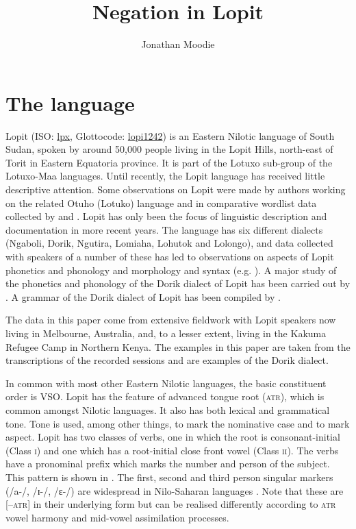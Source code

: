 \documentclass[output=paper,colorlinks,citecolor=brown,draftmode]{langscibook}
\author{Jonathan Moodie\affiliation{University of Melbourne}}
\title{Negation in Lopit}
\begin{document}
\maketitle 
\examplesitalics
\section{The language}

Lopit (ISO: \href{https://iso639-3.sil.org/code/lpx}{lpx}, Glottocode: \href{https://glottolog.org/resource/languoid/id/lopi1242}{lopi1242}) is an Eastern Nilotic language of South Sudan, spoken by around 50,000 people living in the Lopit Hills, north-east of Torit in Eastern Equatoria province. It is part of the Lotuxo sub-group of the Lotuxo-Maa languages. Until recently, the Lopit language has received little descriptive attention. Some observations on Lopit were made by authors working on the related Otuho (Lotuko) language \citep{Muratori1938} and in comparative wordlist data collected by \citet{Driberg1932} and \citet{Vossen1982}. Lopit has only been the focus of linguistic description and documentation in more recent years. The language has six different dialects (Ngaboli, Dorik, Ngutira, Lomiaha, Lohutok and Lolongo), and data collected with speakers of a number of these has led to observations on aspects of Lopit phonetics and phonology  \citep{Stirtz2014, Turner2001} and morphology and syntax (e.g. \citealt{LaduEtAl2014}). A major study of the phonetics and phonology of the Dorik dialect of Lopit has been carried out by \citet{Billington2017}.  A grammar of the Dorik dialect of Lopit has been compiled by \citet{MoodieBillington2020}. 


The data in this paper come from extensive fieldwork with Lopit speakers now living in Melbourne, Australia, and, to a lesser extent, living in the Kakuma Refugee Camp in Northern Kenya. The examples in this paper are taken from the transcriptions of the recorded sessions and are examples of the Dorik dialect.

In common with most other Eastern Nilotic languages, the basic constituent order is VSO.  Lopit has the feature of advanced tongue root (\textsc{atr}), which is common amongst Nilotic languages. It also has both lexical and grammatical tone. Tone is used, among other things, to mark the nominative case and to mark aspect. Lopit has two classes of verbs, one in which the root is consonant-initial (Class \textsc{i}) and one which has a root-initial close front vowel (Class \textsc{ii}). The verbs have a pronominal prefix which marks the number and person of the subject. This pattern is shown in . The first, second and third person singular markers (/a-/, /ɪ-/, /ɛ-/) are widespread in Nilo-Saharan languages \citep[86]{Greenberg1966Africa}. Note that these are [–\textsc{atr}] in their underlying form but can be realised differently according to \textsc{atr} vowel harmony and mid-vowel assimilation processes. 
\end{document}

